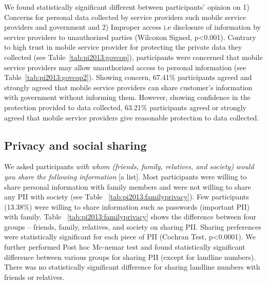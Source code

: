 We found statistically significant different between participants' opinion on 1) Concerns for personal data collected by service providers such mobile service providers and government and 2) Improper access i.e disclosure of information by service providers to unauthorized parties (Wilcoxon Signed, p<0.001). Contrary to high trust in mobile service provider for protecting the private data they collected (see Table~\ref{tab:pi2013:govcop}), participants were concerned that mobile service providers may allow unauthorized access to personal information (see Table~\ref{tab:pi2013:govcop2}). Showing concern, 67.41\% participants agreed and strongly agreed that mobile service providers can share customer's information with government without informing them. However, showing confidence in the protection provided to data collected, 63.21\% participants agreed or strongly agreed that mobile service providers give reasonable protection to data collected. 

\subsection{Privacy and social sharing}
We asked participants \emph{with whom (friends, family, relatives, and society) would you share the following information} [a list]. Most participants were willing to share personal information with family members and were not willing to share any PII with society (see Table~ \ref{tab:pi2013:familyprivacy}).
Few participants (13.38\%) were willing to share information such as passwords (important PII) with family. Table~ \ref{tab:pi2013:familyprivacy} shows the difference between four groups --  friends, family, relatives, and society on sharing PII. Sharing preferences were statistically significant for each piece of PII (Cochran Test, p<0.0001). We further performed Post hoc Mc-nemar test and found statistically significant difference between various groups for sharing PII (except for landline numbers). There was no statistically significant difference for sharing landline numbers with friends or relatives. 

